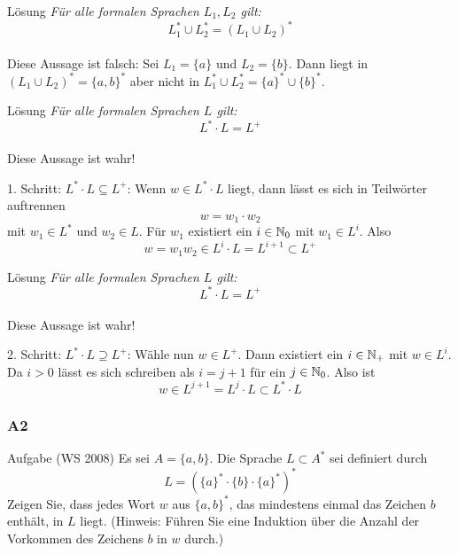 \begin{frame}{Lösung}
	\textit{Für alle formalen Sprachen $L_1 , L_2$ gilt: 
		$$L_1^\ast \cup L_2^\ast = (L_1 \cup L_2 )^\ast$$ } \\[2em] \pause
	Diese Aussage ist falsch: Sei $L_1 = \{a\}$ und $L_2 = \{b\}$. Dann liegt  in $(L_1 \cup L_2 )^\ast = \{a, b\}^\ast$ aber nicht in $L_1^\ast \cup L_2^\ast = \{a\}^\ast \cup \{b\}^\ast$.
\end{frame}

\begin{frame}{Lösung}
	\textit{Für alle formalen Sprachen $L$ gilt: 
		$$L^\ast \cdot L = L^+ $$ } \\[1em] \pause
	Diese Aussage ist wahr! 
	\begin{block}{1. Schritt: $L^\ast \cdot L \subseteq L^+$:} \pause
	Wenn $w \in L^\ast \cdot L$ liegt, dann lässt es sich in Teilwörter auftrennen $$ w = w_1 \cdot w_2$$ mit $w_1 \in L^\ast$ und $w_2 \in L$. Für $w_1$ existiert ein $i \in \mathbb{N}_0$ mit $w_1 \in L^i$. Also $$w = w_1 w_2 \in L^i \cdot L = L^{i+1} \subset L^+$$
	\end{block}
\end{frame}

\begin{frame}{Lösung}
	\textit{Für alle formalen Sprachen $L$ gilt: 
		$$L^\ast \cdot L = L^+ $$ } \\[1em] 
	Diese Aussage ist wahr! 
	\begin{block}{2. Schritt: $L^\ast \cdot L \supseteq L^+$:} \pause
	Wähle nun $w \in L^+$. Dann existiert ein $i \in \mathbb{N}_+$ mit $w \in L^i$. Da $i > 0$ lässt es sich schreiben als $i = j + 1$ für ein $j \in \mathbb{N}_0$. Also ist $$w \in L^{j+1} = L^j \cdot L \subset L^\ast \cdot L$$
	\end{block}
\end{frame}

\subsubsection{A2}
\begin{frame}{Aufgabe (WS 2008) }
	Es sei $A = \{a, b\}$. Die Sprache $L \subset A^\ast$ sei definiert durch $$L = (\{a\}^\ast \cdot \{b\} \cdot \{a\}^\ast)^\ast$$
	Zeigen Sie, dass jedes Wort $w$ aus $\{a, b\}^\ast$, das mindestens einmal das Zeichen
	$b$ enthält, in $L$ liegt. (Hinweis: Führen Sie eine Induktion über die Anzahl der
	Vorkommen des Zeichens $b$ in $w$ durch.)
\end{frame}

